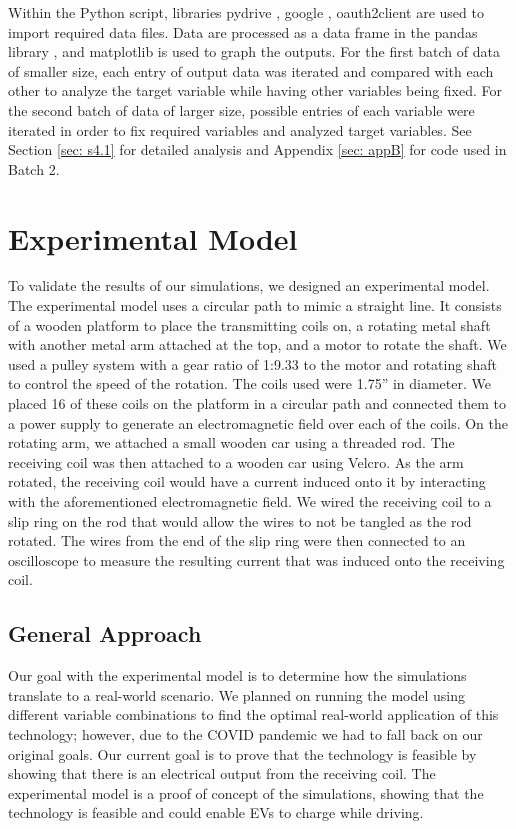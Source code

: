Within the Python script, libraries pydrive \cite{nabel_pydrive_nodate}, google \cite{noauthor_breaking_nodate}, 
oauth2client \cite{noauthor_what_nodate} are used to import required data files. Data are processed as a data frame in 
the pandas library \cite{jeff_reback_pandas-devpandas_2021}, and matplotlib \cite{hunter_matplotlib_2007} is used 
to graph the outputs. For the first batch of data of smaller size, each entry of output data was iterated and compared 
with each other to analyze the target variable while having other variables being fixed. For the second batch of 
data of larger size, possible entries of each variable were iterated in order to fix required variables and analyzed 
target variables. See Section \ref{sec: s4.1} for detailed analysis and Appendix \ref{sec: appB} for code used in Batch 2.

\section{Experimental Model}
To validate the results of our simulations, we designed an experimental model. The experimental model uses a 
circular path to mimic a straight line. It consists of a wooden platform to place the transmitting coils on, 
a rotating metal shaft with another metal arm attached at the top, and a motor to rotate the shaft. 
We used a pulley system with a gear ratio of 1:9.33 to the motor and rotating shaft to control the speed of 
the rotation. The coils used were 1.75” in diameter. We placed 16 of these coils on the platform in a circular 
path and connected them to a power supply to generate an electromagnetic field over each of the coils. 
On the rotating arm, we attached a small wooden car using a threaded rod. The receiving coil was then 
attached to a wooden car using Velcro. As the arm rotated, the receiving coil would have a current induced 
onto it by interacting with the aforementioned electromagnetic field. We wired the receiving coil to a slip 
ring on the rod that would allow the wires to not be tangled as the rod rotated. The wires from the end of 
the slip ring were then connected to an oscilloscope to measure the resulting current that was induced onto 
the receiving coil. 

\subsection{General Approach}
Our goal with the experimental model is to determine how the simulations translate to a real-world scenario. 
We planned on running the model using different variable combinations to find the optimal real-world application 
of this technology; however, due to the COVID pandemic we had to fall back on our original goals. 
Our current goal is to prove that the technology is feasible by showing that there is an electrical 
output from the receiving coil. The experimental model is a proof of concept of the simulations, 
showing that the technology is feasible and could enable EVs to charge while driving.

